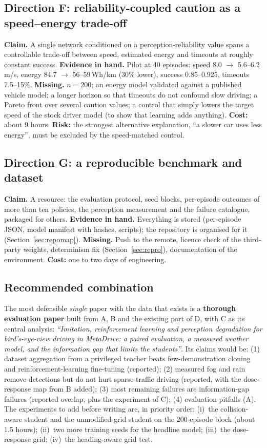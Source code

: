 \subsection{Direction F: reliability-coupled caution as a speed--energy trade-off}
\textbf{Claim.} A single network conditioned on a perception-reliability value spans a controllable trade-off between speed, estimated energy and timeouts at roughly constant success.
\textbf{Evidence in hand.} Pilot at 40 episodes: speed 8.0 $\to$ 5.6--6.2\,m/s, energy 84.7 $\to$ 56--59\,Wh/km (30\% lower), success 0.85--0.925, timeouts 7.5--15\%.
\textbf{Missing.} $n=200$; an energy model validated against a published vehicle model; a longer horizon so that timeouts do not confound slow driving; a Pareto front over several caution values; a control that simply lowers the target speed of the stock driver model (to show that learning adds anything). \textbf{Cost:} about 9 hours. \textbf{Risk:} the strongest alternative explanation, ``a slower car uses less energy'', must be excluded by the speed-matched control.

\subsection{Direction G: a reproducible benchmark and dataset}
\textbf{Claim.} A resource: the evaluation protocol, seed blocks, per-episode outcomes of more than ten policies, the perception measurement and the failure catalogue, packaged for others.
\textbf{Evidence in hand.} Everything is stored (per-episode JSON, model manifest with hashes, scripts); the repository is organised for it (Section~\ref{sec:repomap}).
\textbf{Missing.} Push to the remote, licence check of the third-party weights, determinism fix (Section~\ref{sec:repro}), documentation of the environment. \textbf{Cost:} one to two days of engineering.

\subsection{Recommended combination}
The most defensible \emph{single} paper with the data that exists is a \textbf{thorough evaluation paper} built from A, B and the existing part of D, with C as its central analysis: \emph{``Imitation, reinforcement learning and perception degradation for bird's-eye-view driving in MetaDrive: a paired evaluation, a measured weather model, and the information gap that limits the students''}.
Its claims would be: (1) dataset aggregation from a privileged teacher beats few-demonstration cloning and reinforcement-learning fine-tuning (reported); (2) measured fog and rain remove detections but do not hurt sparse-traffic driving (reported, with the dose-response map from B added); (3) most remaining failures are information-gap failures (reported overlap, plus the experiment of C); (4) evaluation pitfalls (A).
The experiments to add before writing are, in priority order: (i)~the collision-aware student and the unmodified-grid student on the 200-episode block (about 1.5 hours); (ii)~two more training seeds for the headline model; (iii)~the dose-response grid; (iv)~the heading-aware grid test.
